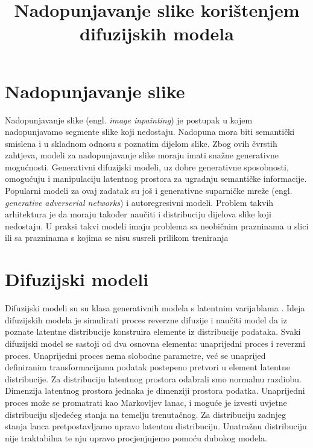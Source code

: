 \documentclass[10pt, a4paper, croatian]{article}
\title{Nadopunjavanje slike korištenjem difuzijskih modela}
\begin{document}
\maketitleabstract

\section{Nadopunjavanje slike}
Nadopunjavanje slike (engl. \emph{image inpainting}) je postupak u kojem nadopunjavamo segmente slike koji nedostaju. Nadopuna mora biti 
semantički smislena i u skladnom odnosu s poznatim dijelom slike. Zbog ovih čvrstih zahtjeva, modeli za nadopunjavanje slike moraju imati 
snažne generativne mogućnosti. Generativni difuzijski modeli, uz dobre generativne sposobnosti, omogućuju i manipulaciju latentnog prostora 
za ugradnju semantičke informacije. Popularni modeli za ovaj zadatak su još i generativne suparničke mreže 
(engl. \emph{generative adverserial networks}) i autoregresivni modeli. Problem takvih arhitektura je da moraju također naučiti i distribuciju
dijelova slike koji nedostaju. U praksi takvi modeli imaju problema sa neobičnim prazninama u slici ili sa prazninama s kojima se nisu
susreli prilikom treniranja


\section{Difuzijski modeli}
Difuzijski modeli su su klasa generativnih modela s latentnim varijablama \cite{diffusion}. Ideja difuzijskih modela je simulirati proces reverzne difuzije 
i naučiti model da iz poznate latentne distribucije konstruira elemente iz distribucije podataka. Svaki difuzijski model se sastoji od dva
osnovna elementa: unaprijedni proces i reverzni proces. Unaprijedni proces nema slobodne parametre, već se unaprijed definiranim 
transformacijama podatak postepeno pretvori u element latentne distribucije. Za distribuciju latentnog prostora odabrali smo normalnu razdiobu.
Dimenzija latentnog prostora jednaka je dimenziji prostora podatka. Unaprijedni proces može se promatrati kao Markovljev lanac, i moguće je 
izvesti uvjetne distribuciju sljedećeg stanja na temelju trenutačnog. Za distribuciju zadnjeg stanja lanca pretpostavljamo upravo latentnu 
distribuciju. Unatražnu distribuciju nije traktabilna te nju upravo procjenjujemo pomoću dubokog modela. 
\end{document}
